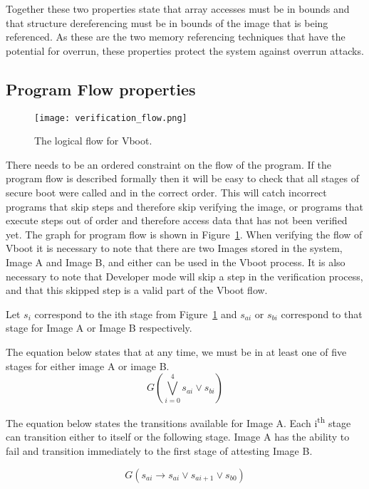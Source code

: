 Together these two properties state that array accesses must be in bounds and that structure dereferencing must be in bounds of the image that is being referenced.
As these are the two memory referencing techniques that have the potential for overrun, these properties protect the system against overrun attacks.

\subsection{Program Flow properties}

\begin{figure}
  \centering
  \texttt{[image: verification\_flow.png]}
  \caption[Verified Boot Program Flow]{The logical flow for Vboot.}\label{fig:v_flow}
\end{figure}

There needs to be an ordered constraint on the flow of the program. 
If the program flow is described formally then it will be easy to check that all stages of secure boot were called and in the correct order.
This will catch incorrect programs that skip steps and therefore skip verifying the image, or programs that execute steps out of order and therefore access data that has not been verified yet.
The graph for program flow is shown in Figure~\ref{fig:v_flow}.
When verifying the flow of Vboot it is necessary to note that there are two Images stored in the system, Image A and Image B, and either can be used in the Vboot process. 
It is also necessary to note that Developer mode will skip a step in the verification process, and that this skipped step is a valid part of the Vboot flow.

Let $s_i$ correspond to the ith stage from Figure~\ref{fig:v_flow} and $s_{ai}$ or $s_{bi}$ correspond to that stage for Image A or Image B respectively.

The equation below states that at any time, we must be in at least one of five stages for either image A or image B.
\begin{equation}
    G(\bigvee\limits_{i = 0}^{4} s_{ai} \lor s_{bi})
\end{equation}

The equation below states the transitions available for Image A.
Each i\textsuperscript{th} stage can transition either to itself or the following stage.
Image A has the ability to fail and transition immediately to the first stage of attesting Image B.

\begin{equation}
    G(s_{ai} \to s_{ai} \lor s_{ai+1} \lor s_{b0})
\end{equation}

